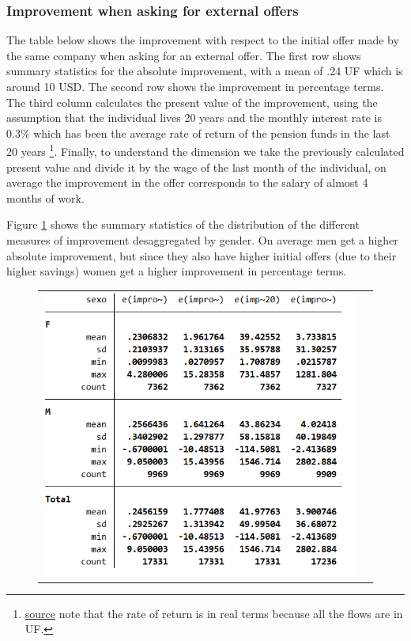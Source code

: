 \documentclass[12pt]{article}
\begin{document}



\subsubsection{Improvement when asking for external offers}

The table below shows the improvement with respect to the initial offer made by the same company when asking for an external offer. The first row shows summary statistics for the absolute improvement, with a mean of .24 UF which is around 10 USD. The second row shows the improvement in percentage terms. The third column calculates the present value of the improvement, using the assumption that the individual lives 20 years and the monthly interest rate is 0.3\% which has been the average rate of return of the pension funds in the last 20 years \footnote{\href{https://bigdatauls.userena.cl/dashboards/rentabilidad-fondo-de-pensiones/}{source} note that the rate of return is in real terms because all the flows are in UF.}. Finally, to understand the dimension we take the previously calculated present value and divide it by the wage of the last month of the individual, on average the improvement in the offer corresponds to the salary of almost 4 months of work.  



Figure \ref{fig:aux} shows the summary statistics of the distribution of the different measures of improvement desaggregated by gender. On average men get a higher absolute improvement, but since they also have higher initial offers (due to their higher savings) women get a higher improvement in percentage terms.
\begin{figure}[H]
\caption{}
\label{fig:aux}
\centering{}%
\begin{tabular}{cc}
\includegraphics[scale=0.7]{Tables/IE3_offer_improvement_bygender.png}
\end{tabular}
\end{figure}
\end{document}
